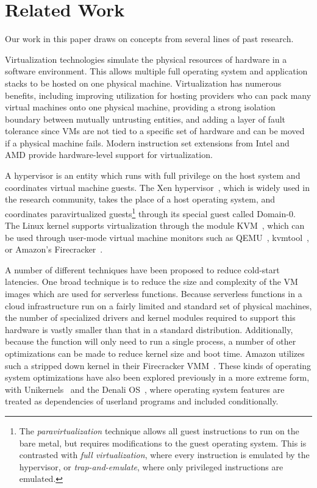 \section{Related Work} \label{sec:related}
Our work in this paper draws on concepts from several lines of past research.

 Virtualization technologies simulate the
physical resources of hardware in a software environment. This allows multiple
full operating system and application stacks to be hosted on one physical
machine. Virtualization has numerous benefits, including improving utilization
for hosting providers who can pack many virtual machines onto one physical
machine, providing a strong isolation boundary between mutually untrusting
entities, and adding a layer of fault tolerance since VMs are not tied to a
specific set of hardware and can be moved if a physical machine fails. Modern
instruction set extensions from Intel and AMD provide hardware-level support
for virtualization.~\cite{virt-techniques}

A hypervisor is an entity which runs with full privilege on the host system and
coordinates virtual machine guests. The Xen hypervisor~\cite{xen}, which is
widely used in the research community, takes the place of a host operating
system, and coordinates paravirtualized guests\footnote{The
\emph{paravirtualization} technique allows all guest instructions to run on the
bare metal, but requires modifications to the guest operating system. This is
contrasted with \emph{full virtualization}, where every instruction is emulated
by the hypervisor, or \emph{trap-and-emulate}, where only privileged
instructions are emulated.} through its special guest called Domain-0. The Linux
kernel supports virtualization through the module KVM~\cite{kvm}, which can be
used through user-mode virtual machine monitors such as QEMU~\cite{qemu},
kvmtool~\cite{kvmtool}, or Amazon's Firecracker~\cite{firecracker}.

 A number of different techniques have
been proposed to reduce cold-start latencies. One broad technique is to reduce
the size and complexity of the VM images which are used for serverless
functions. Because serverless functions in a cloud infrastructure run on
a fairly limited and standard set of physical machines, the number of
specialized drivers and kernel modules required to support this hardware is
vastly smaller than that in a standard distribution.  Additionally, because the
function will only need to run a single process, a number of other optimizations
can be made to reduce kernel size and boot time. Amazon utilizes such a stripped
down kernel in their Firecracker VMM~\cite{firecracker}. These kinds of
operating system optimizations have also been explored previously in a more
extreme form, with Unikernels~\cite{unikernels} and the Denali OS~\cite{denali},
where operating system features are treated as dependencies of userland programs
and included conditionally.

